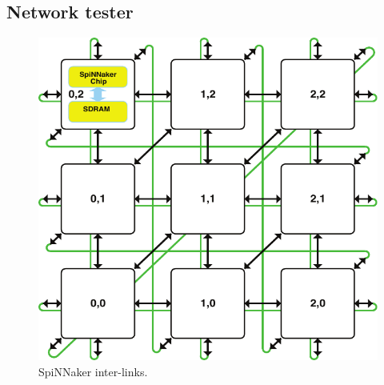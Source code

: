 \documentclass[a4paper, 11pt]{article}
\begin{document}
\subsection{Network tester}
\begin{figure}[htbp]
	\centering
	\includegraphics[width=0.4\linewidth]{images/system_architecture.pdf}
	\caption{SpiNNaker inter-links.}
	\label{fig:interchip_links}	
\end{figure}
\end{document}
